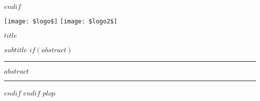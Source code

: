 \begin{titlepage}
$endif$
%
%
\newpage
\pagestyle{empty}
\begin{minipage}{\linewidth}

  \texttt{[image: \$logo\$]} \hspace{8cm}  \texttt{[image: \$logo2\$]}

\end{minipage}

\vspace{2cm}

\LARGE\textbf{$title$}


\large\textbf{$subtitle$}
$if(abstract)$

\vspace{2cm}

\begin{center}

\end{center}
\par\rule{\textwidth}{0.5pt} 

$abstract$

\par\rule{\textwidth}{0.5pt} 


$endif$
$endif$
$plop$
\end{titlepage}
